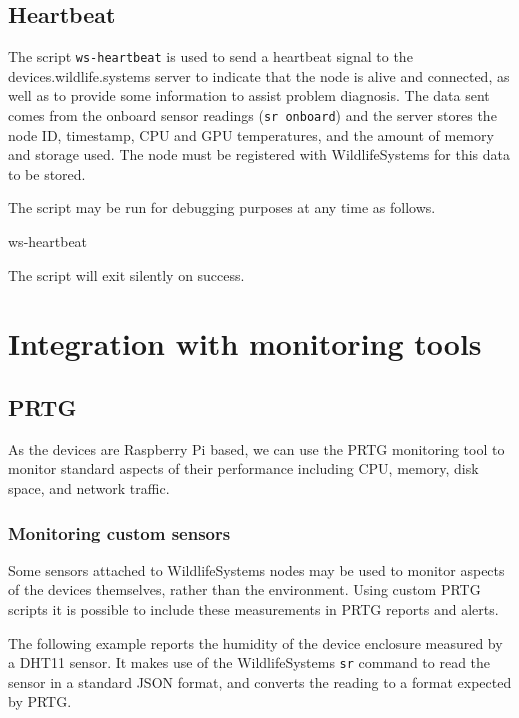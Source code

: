 \documentclass[
]{book}
\newenvironment{Shaded}{\begin{snugshade}}{\end{snugshade}}
\newcommand{\ExtensionTok}[1]{#1}
\begin{document}
\section{Heartbeat}\label{heartbeat}

The script \texttt{ws-heartbeat} is used to send a heartbeat signal to the devices.wildlife.systems server to indicate that the node is alive and connected, as well as to provide some information to assist problem diagnosis. The data sent comes from the onboard sensor readings (\texttt{sr\ onboard}) and the server stores the node ID, timestamp, CPU and GPU temperatures, and the amount of memory and storage used. The node must be registered with WildlifeSystems for this data to be stored.

The script may be run for debugging purposes at any time as follows.

\begin{Shaded}
\begin{Highlighting}[]
\ExtensionTok{ws{-}heartbeat}
\end{Highlighting}
\end{Shaded}

The script will exit silently on success.

\chapter{Integration with monitoring tools}\label{integration-with-monitoring-tools}

\section{PRTG}\label{prtg}

As the devices are Raspberry Pi based, we can use the PRTG monitoring tool to monitor standard aspects of their performance including CPU, memory, disk space, and network traffic.

\subsection{Monitoring custom sensors}\label{monitoring-custom-sensors}

Some sensors attached to WildlifeSystems nodes may be used to monitor aspects of the devices themselves, rather than the environment. Using custom PRTG scripts it is possible to include these measurements in PRTG reports and alerts.

The following example reports the humidity of the device enclosure measured by a DHT11 sensor. It makes use of the WildlifeSystems \texttt{sr} command to read the sensor in a standard JSON format, and converts the reading to a format expected by PRTG.
\end{document}
